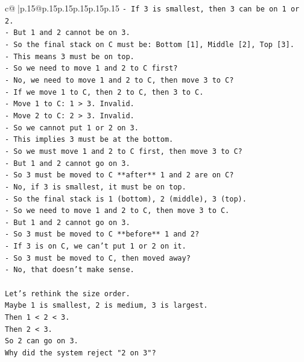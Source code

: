\documentclass{article}
\begin{document}
{\begin{supertabular}{c@{$\;$}|p{.15\linewidth}@{}p{.15\linewidth}p{.15\linewidth}p{.15\linewidth}p{.15\linewidth}p{.15\linewidth}}
{{{\texttt{{-} If 3 is smallest, then 3 can be on 1 or 2.} \\
\texttt{{-} But 1 and 2 cannot be on 3.} \\
\texttt{{-} So the final stack on C must be: Bottom {[}1{]}, Middle {[}2{]}, Top {[}3{]}.} \\
\texttt{{-} This means 3 must be on top.} \\
\texttt{{-} So we need to move 1 and 2 to C first?} \\
\texttt{{-} No, we need to move 1 and 2 to C, then move 3 to C?} \\
\texttt{{-} If we move 1 to C, then 2 to C, then 3 to C.} \\
\texttt{{-} Move 1 to C: 1 > 3. Invalid.} \\
\texttt{{-} Move 2 to C: 2 > 3. Invalid.} \\
\texttt{{-} So we cannot put 1 or 2 on 3.} \\
\texttt{{-} This implies 3 must be at the bottom.} \\
\texttt{{-} So we must move 1 and 2 to C first, then move 3 to C?} \\
\texttt{{-} But 1 and 2 cannot go on 3.} \\
\texttt{{-} So 3 must be moved to C **after** 1 and 2 are on C?} \\
\texttt{{-} No, if 3 is smallest, it must be on top.} \\
\texttt{{-} So the final stack is 1 (bottom), 2 (middle), 3 (top).} \\
\texttt{{-} So we need to move 1 and 2 to C, then move 3 to C.} \\
\texttt{{-} But 1 and 2 cannot go on 3.} \\
\texttt{{-} So 3 must be moved to C **before** 1 and 2?} \\
\texttt{{-} If 3 is on C, we can't put 1 or 2 on it.} \\
\texttt{{-} So 3 must be moved to C, then moved away?} \\
\texttt{{-} No, that doesn't make sense.} \\
\\ 
\texttt{Let's rethink the size order.} \\
\texttt{Maybe 1 is smallest, 2 is medium, 3 is largest.} \\
\texttt{Then 1 < 2 < 3.} \\
\texttt{Then 2 < 3.} \\
\texttt{So 2 can go on 3.} \\
\texttt{Why did the system reject "2 on 3"?} \\
}}}
\end{supertabular}}
\end{document}
